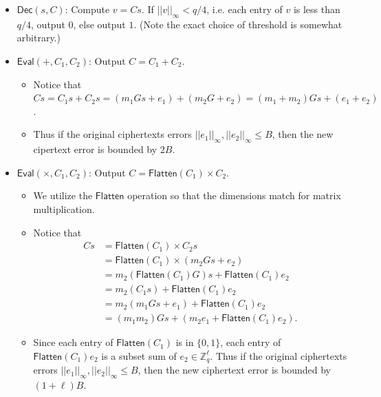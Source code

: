 \begin{itemize}
    \item $\mathsf{Dec}(s, C)$: Compute $v = Cs$. If $||v||_\infty < q/4$, i.e. each entry of $v$ is less than $q/4$, output $0$, else output $1$. (Note the exact choice of threshold is somewhat arbitrary.)
    
    \item $\mathsf{Eval}(+, C_1, C_2)$: Output $C = C_1 + C_2$. 

    \begin{itemize}
        \item Notice that $Cs = C_1s + C_2s = (m_1 Gs + e_1) + (m_2 G + e_2) = (m_1 + m_2) Gs + (e_1 + e_2)$. 

        \item Thus if the original ciphertexts errors $||e_1||_{\infty}, ||e_2||_{\infty} \leq B$, then the new cipertext error is bounded by $2B$. 
    \end{itemize} 

    \item $\mathsf{Eval}(\times, C_1, C_2)$: Output $C = \mathsf{Flatten}(C_1) \times C_2$. 

    \begin{itemize}
        \item We utilize the $\mathsf{Flatten}$ operation so that the dimensions match for matrix multiplication. 

        \item Notice that 
        \begin{align*}
            Cs & = \mathsf{Flatten}(C_1) \times C_2 s \\
            & = \mathsf{Flatten}(C_1) \times (m_2 G s + e_2) \\ 
            & = m_2 (\mathsf{Flatten}(C_1) G) s + \mathsf{Flatten}(C_1) e_2 \\ 
            & = m_2 (C_1 s) + \mathsf{Flatten}(C_1) e_2 \\
            & = m_2 (m_1 Gs + e_1) + \mathsf{Flatten}(C_1) e_2 \\ 
            & = (m_1 m_2) G s + (m_2 e_1 + \mathsf{Flatten}(C_1) e_2). 
        \end{align*} 

        \item Since each entry of $\mathsf{Flatten}(C_1)$ is in $\{0,1\}$, each entry of $\mathsf{Flatten}(C_1) e_2$ is a subset sum of $e_2 \in \mathbb{Z}_q^{\ell}$. Thus if the original ciphertexts errors $||e_1||_{\infty}, ||e_2||_{\infty} \leq B$, then the new ciphertext error is bounded by $(1+\ell)B$. 
    \end{itemize}
\end{itemize}

